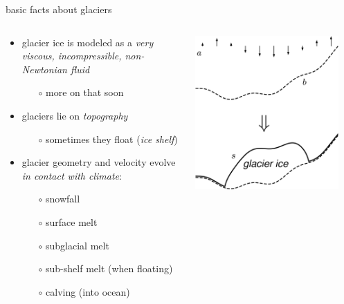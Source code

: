 \documentclass[svgnames,
               hyperref={colorlinks,citecolor=DeepPink4,linkcolor=FireBrick,urlcolor=Maroon},
               usepdftitle=false]  %
               {beamer}
\begin{document}
\begin{frame}{basic facts about glaciers}

\begin{columns}
\begin{column}{0.6\textwidth}
\begin{itemize}
\item glacier ice is modeled as a \emph{very viscous, incompressible, non-Newtonian fluid}
    \begin{itemize}
    \item[$\circ$] more on that soon
    \end{itemize}
\item glaciers lie on \emph{topography}
    \begin{itemize}
    \item[$\circ$] sometimes they float  (\emph{ice shelf})
    \end{itemize}
\item glacier geometry and velocity evolve \emph{in contact with climate}:
    \begin{itemize}
    \item[$\circ$] snowfall
    \item[$\circ$] surface melt
    \item[$\circ$] subglacial melt
    \item[$\circ$] sub-shelf melt (when floating)
    \item[$\circ$] calving (into ocean)
    \end{itemize}
\end{itemize}
\end{column}
\begin{column}{0.42\textwidth}
\hfill \includegraphics[width=0.9\textwidth]{../images/map-glacier-ice.png}
\end{column}
\end{columns}
\end{frame}
\end{document}
